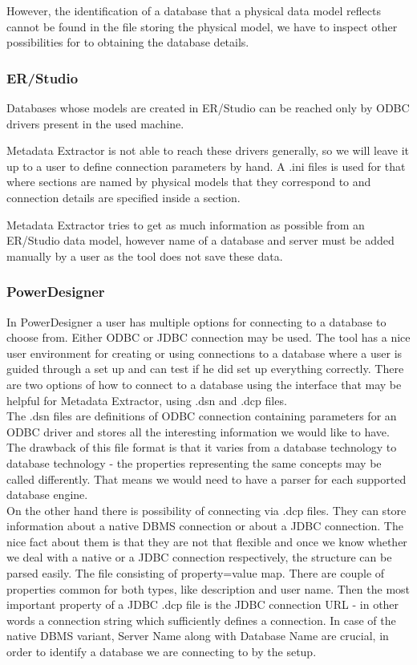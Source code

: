 However, the identification of a database that a physical data model reflects cannot be found in the file storing the physical model, we have to inspect other possibilities for to obtaining the database details.

\subsubsection{ER/Studio}

Databases whose models are created in ER/Studio can be reached only by ODBC drivers present in the used machine.

Metadata Extractor is not able to reach these drivers generally, so we will leave it up to a user to define connection parameters by hand.
A .ini files \label{ini_connections}is used for that where sections are named by physical models that they correspond to and connection details are specified inside a section. 

Metadata Extractor tries to get as much information as possible from an ER/Studio data model, however name of a database and server must be added manually by a user as the tool does not save these data.

\subsubsection{PowerDesigner}

In PowerDesigner a user has multiple options for connecting to a database to choose from. Either ODBC or JDBC connection may be used. 
The tool has a nice user environment for creating or using connections to a database where a user is guided through a set up and can test if he did set up everything correctly. 
There are two options of how to connect to a database using the interface that may be helpful for Metadata Extractor, using .dsn and .dcp files.\\

The .dsn files are definitions of ODBC connection containing parameters for an ODBC driver and stores all the interesting information we would like to have. 
The drawback of this file format is that it varies from a database technology to database technology - the properties representing the same concepts may be called differently. That means we would need to have a parser for each supported database engine. \\

On the other hand there is possibility of connecting via .dcp files. They can store information about a native DBMS connection or about a JDBC connection. 
The nice fact about them is that they are not that flexible and once we know whether we deal with a native or a JDBC connection respectively, the structure can be parsed easily. 
The file consisting of property=value map.
There are couple of properties common for both types, like description and user name.
Then the most important property of a JDBC .dcp file is the JDBC connection URL - in other words a connection string which sufficiently defines a connection.
In case of the native DBMS variant, Server Name along with Database Name are crucial, in order to identify a database we are connecting to by the setup.

